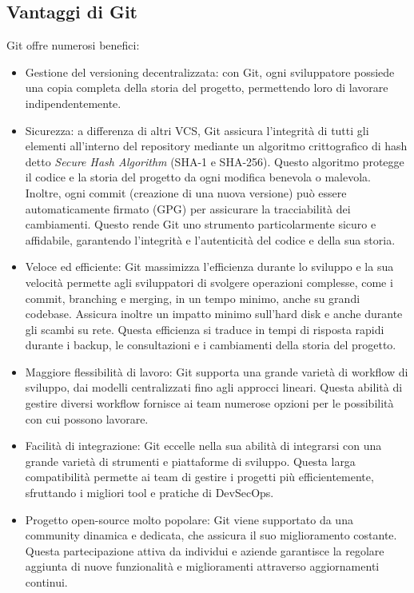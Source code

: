 \subsection{Vantaggi di Git}
Git offre numerosi benefici:
\begin{itemize}
    \item Gestione del versioning decentralizzata: con Git, ogni sviluppatore possiede una copia completa della storia del progetto, permettendo loro di lavorare indipendentemente.
    \item Sicurezza: a differenza di altri VCS, Git assicura l'integrità di tutti gli elementi all'interno del repository mediante un algoritmo crittografico di hash detto \textit{Secure Hash Algorithm} (SHA-1 e SHA-256). Questo algoritmo protegge il codice e la storia del progetto da ogni modifica benevola o malevola. Inoltre, ogni commit (creazione di una nuova versione) può essere automaticamente firmato (GPG) per assicurare la tracciabilità dei cambiamenti. Questo rende Git uno strumento particolarmente sicuro e affidabile, garantendo l'integrità e l'autenticità del codice e della sua storia.
    \item Veloce ed efficiente: Git massimizza l'efficienza durante lo sviluppo e la sua velocità permette agli sviluppatori di svolgere operazioni complesse, come i commit, branching e merging, in un tempo minimo, anche su grandi codebase. Assicura inoltre un impatto minimo sull'hard disk e anche durante gli scambi su rete. Questa efficienza si traduce in tempi di risposta rapidi durante i backup, le consultazioni e i cambiamenti della storia del progetto.
    \item Maggiore flessibilità di lavoro: Git supporta una grande varietà di workflow di sviluppo, dai modelli centralizzati fino agli approcci lineari. Questa abilità di gestire diversi workflow fornisce ai team numerose opzioni per le possibilità con cui possono lavorare.
    \item Facilità di integrazione: Git eccelle nella sua abilità di integrarsi con una grande varietà di strumenti e piattaforme di sviluppo. Questa larga compatibilità permette ai team di gestire i progetti più efficientemente, sfruttando i migliori tool e pratiche di DevSecOps.
    \item Progetto open-source molto popolare: Git viene supportato da una community dinamica e dedicata, che assicura il suo miglioramento costante. Questa partecipazione attiva da individui e aziende garantisce la regolare aggiunta di nuove funzionalità e miglioramenti attraverso aggiornamenti continui.
\end{itemize}

